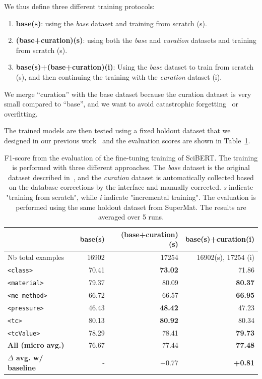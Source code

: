 \documentclass[a4paper]{article}
\begin{document}
We thus define three different training protocols: 
\begin{enumerate}
    \item \textbf{base(s)}: using the \emph{base} dataset and training from scratch (s).
    \item \textbf{(base+curation)(s)}: using both the \emph{base} and \emph{curation} datasets and training from scratch (s).
    \item \textbf{base(s)+(base+curation)(i)}: Using the \emph{base} dataset to train from scratch (s), and then continuing the training with the \emph{curation} dataset (i).
\end{enumerate}
We merge ``curation'' with the base dataset because the curation dataset is very small compared to ``base'', and we want to avoid catastrophic forgetting~\cite{overcoming-kirkpatrick-etal-2016} or overfitting.

The trained models are then tested using a fixed holdout dataset that we designed in our previous work~\cite{lfoppiano2023automatic} and the evaluation scores are shown in Table~\ref{tab:evaluation-curation-training2}.

\begin{table}[ht]
\centering\small
\caption{F1-score from the evaluation of the fine-tuning training of SciBERT. The training is performed with three different approaches. 
The \emph{base} dataset is the original dataset described in~\cite{lfoppiano2023automatic}, and the \emph{curation} dataset is automatically collected based on the database corrections by the interface and manually corrected. \textit{s} indicate "training from scratch", while \textit{i} indicate "incremental training". 
The evaluation is performed using the same holdout dataset from SuperMat. 
The results are averaged over 5 runs. }
\begin{tabular}{lrrr}
\toprule
& \textbf{base(s)} & \textbf{(base+curation)(s)} & \textbf{base(s)+curation(i)} \\ 
\midrule
Nb total examples & 16902 & 17254 & 16902(s), 17254 (i)\\ 
\midrule
\texttt{<class>}        & 70.41         & \textbf{73.02}         & 71.86 \\ 
\texttt{<material>}     & 79.37         & 80.09         & \textbf{80.37} \\ 
\texttt{<me\_method>}   & 66.72         & 66.57         & \textbf{66.95} \\ 
\texttt{<pressure>}     & 46.43         & \textbf{48.42}         & 47.23 \\ 
\texttt{<tc>}           & 80.13         & \textbf{80.92}         & 80.34 \\ 
\texttt{<tcValue>}      & 78.29         & 78.41         & \textbf{79.73} \\ 
\midrule
\textbf{All (micro avg.)} & 76.67       & 77.44         & \textbf{77.48} \\ 
\midrule
\textbf{$\Delta$ avg. w/ baseline}& -   & +0.77     & \textbf{+0.81} \\ 
\bottomrule
\end{tabular}
\label{tab:evaluation-curation-training2}
\end{table}
\end{document}
